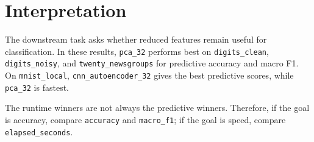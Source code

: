 \documentclass[11pt]{article}
\begin{document}
\section{Interpretation}

The downstream task asks whether reduced features remain useful for
classification. In these results, \texttt{pca\_32} performs best on
\texttt{digits\_clean}, \texttt{digits\_noisy}, and
\texttt{twenty\_newsgroups} for predictive accuracy and macro F1. On
\texttt{mnist\_local}, \texttt{cnn\_autoencoder\_32} gives the best predictive
scores, while \texttt{pca\_32} is fastest.

The runtime winners are not always the predictive winners. Therefore, if the
goal is accuracy, compare \texttt{accuracy} and \texttt{macro\_f1}; if the goal
is speed, compare \texttt{elapsed\_seconds}.
\end{document}
